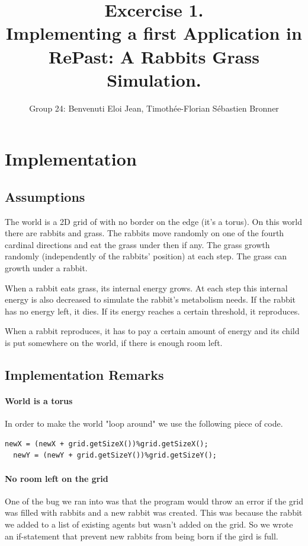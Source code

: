 \documentclass[11pt]{article}
\title{\bf Excercise 1.\\ Implementing a first Application in RePast: A Rabbits Grass Simulation.}
\author{Group 24: Benvenuti Eloi Jean, Timothée-Florian S\'ebastien Bronner}
\begin{document}
\lstset{language=java}
\maketitle

\section{Implementation}

\subsection{Assumptions}
The world is a 2D grid of with no border on the edge (it's a torus). On this world there are rabbits and grass. The rabbits move randomly on one of the fourth cardinal directions and eat the grass under then if any. The grass growth randomly (independently of the rabbits' position) at each step. The grass can growth under a rabbit.

When a rabbit eats grass, its internal energy grows. At each step this internal energy is also decreased to simulate the rabbit's metabolism needs. If the rabbit has no energy left, it dies. If its energy reaches a certain threshold, it reproduces.

When a rabbit reproduces, it has to pay a certain amount of energy and its child is put somewhere on the world, if there is enough room left.

\subsection{Implementation Remarks}
\paragraph{World is a torus} In order to make the world "loop around" we use the following piece of code.
\begin{lstlisting}[frame=single]
  newX = (newX + grid.getSizeX())%grid.getSizeX();
  newY = (newY + grid.getSizeY())%grid.getSizeY();
\end{lstlisting}

\paragraph{No room left on the grid}One of the bug we ran into was that the program would throw an error if the grid was filled with rabbits and a new rabbit was created. This was because the rabbit we added to a list of existing agents but wasn't added on the grid. So we wrote an if-statement that prevent new rabbits from being born if the gird is full.
\end{document}
